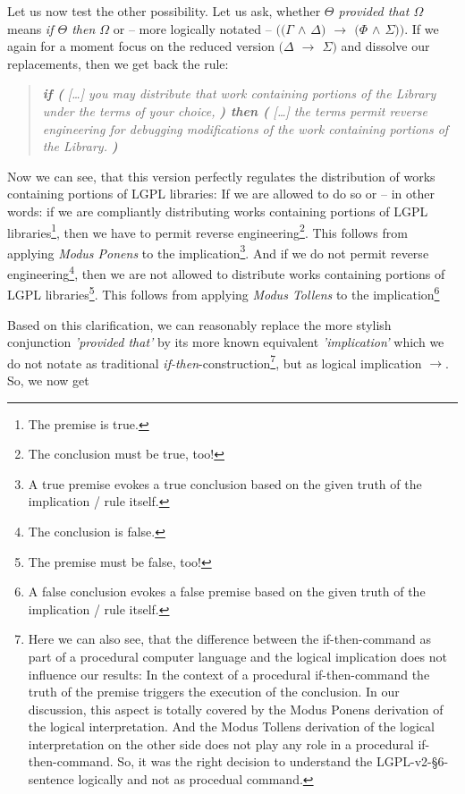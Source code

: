 Let us now test the other possibility. Let us ask, whether \emph{$\Theta$
provided that $\Omega$} means \emph{if $\Theta$ then $\Omega$} or -- more
logically notated -- \emph{$((\Gamma$ $\wedge$ $\Delta)$ $\rightarrow$ $(\Phi$
$\wedge$ $\Sigma))$}. If we again for a moment focus on the reduced version
\emph{$(\Delta$ $\rightarrow$ $\Sigma)$} and dissolve our replacements, then we
get back the rule:

\begin{quote}\noindent\emph{\textbf{if (} [\ldots] you may distribute that work
containing portions of the Library under the terms of your choice, \textbf{)
then (} [\ldots] the terms permit reverse engineering for debugging
modifications of the work containing portions of the Library.
\textbf{)}}\end{quote}

Now we can see, that this version perfectly regulates the distribution of works
containing portions of LGPL libraries: If we are allowed to do so or -- in other
words: if we are compliantly distributing works containing portions of LGPL
libraries\footnote{The premise is true.}, then we have to permit reverse
engineering\footnote{The conclusion must be true, too!}. This follows from
applying \emph{Modus Ponens} to the implication\footnote{A true premise evokes a
true conclusion based on the given truth of the implication / rule itself.}. And
if we do not permit reverse engineering\footnote{The conclusion is false.}, then
we are not allowed to distribute works containing portions of LGPL
libraries\footnote{The premise must be false, too!}. This follows from applying
\emph{Modus Tollens} to the implication\footnote{A false conclusion evokes a
false premise based on the given truth of the implication / rule itself.}

Based on this clarification, we can reasonably replace the more stylish
conjunction \emph{'provided that'} by its more known equivalent
\emph{'implication'} which we do not notate as traditional
\emph{if-then}-construction\footnote{Here we can also see, that the difference
between the if-then-command as part of a procedural computer language and the
logical implication does not influence our results: In the context of a
procedural if-then-command the truth of the premise triggers the execution of
the conclusion. In our discussion, this aspect is totally covered by the Modus
Ponens derivation of the logical interpretation. And the Modus Tollens
derivation of the logical interpretation on the other side does not play any
role in a procedural if-then-command. So, it was the right decision to
understand the LGPL-v2-§6-sentence logically and not as procedual command.}, but
as logical implication \emph{$\rightarrow$}. So, we now get

